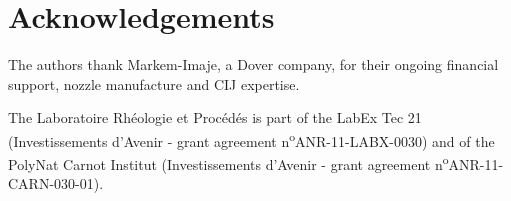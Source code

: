 \documentclass[onecolumn, 12pt]{asme2ej}
\begin{document}
\section{Acknowledgements}
The authors thank Markem-Imaje\textcopyright, a {Dover\textregistered} company, for their ongoing financial support, nozzle manufacture and CIJ expertise.

The Laboratoire Rhéologie et Procédés is part of the LabEx Tec 21 (Investissements d'Avenir - grant agreement n\textsuperscript{o}ANR-11-LABX-0030) and of the PolyNat Carnot Institut (Investissements d'Avenir - grant agreement n\textsuperscript{o}ANR-11- CARN-030-01).


\end{document}
